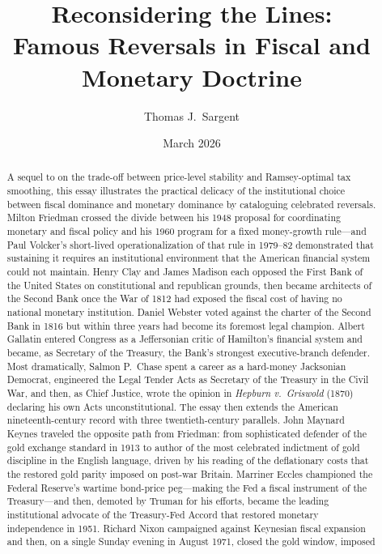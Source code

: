\documentclass[12pt]{article}
\title{Reconsidering the Lines:\\
\large Famous Reversals in Fiscal and Monetary Doctrine}
\author{Thomas J.~Sargent}
\date{March 2026}
\begin{document}
\maketitle

\begin{abstract}
A sequel to \citet{Sargent2011} on the trade-off between price-level
stability and Ramsey-optimal tax smoothing, this essay illustrates the
practical delicacy of the institutional choice between fiscal dominance
and monetary dominance by cataloguing celebrated reversals.  Milton
Friedman crossed the divide between his 1948 proposal for coordinating
monetary and fiscal policy and his 1960 program for a fixed money-growth
rule---and Paul Volcker's short-lived operationalization of that rule in
1979--82 demonstrated that sustaining it requires an institutional
environment that the American financial system could not maintain.
Henry Clay and James Madison each opposed the First Bank of the
United States on constitutional and republican grounds, then became
architects of the Second Bank once the War of 1812 had exposed the
fiscal cost of having no national monetary institution.
Daniel Webster voted against the charter of the Second Bank in 1816 but
within three years had become its foremost legal champion.  Albert
Gallatin entered Congress as a Jeffersonian critic of Hamilton's financial
system and became, as Secretary of the Treasury, the Bank's strongest
executive-branch defender.  Most dramatically, Salmon P.\ Chase spent a
career as a hard-money Jacksonian Democrat, engineered the Legal Tender
Acts as Secretary of the Treasury in the Civil War, and then, as Chief
Justice, wrote the opinion in \textit{Hepburn v.\ Griswold} (1870)
declaring his own Acts unconstitutional.  The essay then extends the
American nineteenth-century record with three twentieth-century
parallels.  John Maynard Keynes traveled the opposite path from
Friedman: from sophisticated defender of the gold exchange standard in
1913 to author of the most celebrated indictment of gold discipline in
the English language, driven by his reading of the deflationary costs
that the restored gold parity imposed on post-war Britain.  Marriner
Eccles championed the Federal Reserve's wartime bond-price peg---making
the Fed a fiscal instrument of the Treasury---and then, demoted by
Truman for his efforts, became the leading institutional advocate of the
Treasury-Fed Accord that restored monetary independence in 1951.  Richard
Nixon campaigned against Keynesian fiscal expansion and then, on a single
Sunday evening in August 1971, closed the gold window, imposed

\end{abstract}
\end{document}
